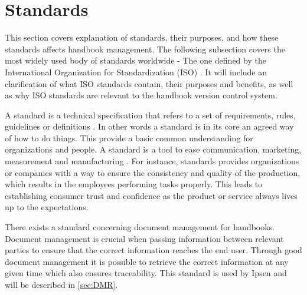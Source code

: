 \section{Standards} \label{sec:standards}
This section covers explanation of standards, their purposes, and how these standards affects handbook management.
The following subsection covers the most widely used body of standards worldwide - The one defined by the International Organization for Standardization (ISO) \cite{ISOworldwidemostused}.
It will include an clarification of what ISO standards contain, their purposes and benefits, as well as why ISO standards are relevant to the handbook version control system.

A standard is a technical specification that refers to a set of requirements, rules, guidelines or definitions \citep[p.~5]{Standard}.
In other words a standard is in its core an agreed way of how to do things.
This provide a basic common understanding for organizations and people.
A standard is a tool to ease communication, marketing, measurement and manufacturing \cite{Standardtool}.
For instance, standards provides organizations or companies with a way to ensure the consistency and quality of the production, which results in the employees performing tasks properly.
This leads to establishing consumer trust and confidence as the product or service always lives up to the expectations. \citep[p.~83]{Standardization}

There exists a standard concerning document management for handbooks.
Document management is crucial when passing information between relevant parties to ensure that the correct information reaches the end user.
Through good document management it is possible to retrieve the correct information at any given time which also ensures traceability.
This standard is used by Ipsen and will be described in \cref{sec:DMR}.

